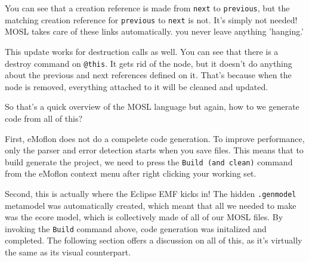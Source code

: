 You can see that a creation reference is made from \texttt{next} to \texttt{previous}, but the matching creation reference for \texttt{previous} to \texttt{next} is not. It's simply not needed! MOSL takes care of these links automatically. you never leave anything 'hanging.'

This update works for destruction calls as well. You can see that there is a destroy command on \texttt{@this}. It gets rid of the node, but it doesn't do anything about the previous and next references defined on it. That's because when the node is removed, everything attached to it will be cleaned and updated.
 
So that's a quick overview of the MOSL language but again, how to we generate code from all of this?

First, eMoflon does not do a compelete code generation. To improve performance, only the parser and error detection starts when you save files. This means that to build generate the project, we need to press the \texttt{Build (and clean)} command from the eMoflon context menu after right clicking your working set.


Second, this is actually where the Eclipse EMF kicks in! The hidden \texttt{.genmodel} metamodel was automatically created, which meant that all we needed to make was the ecore model, which is collectively made of all of our MOSL files. By invoking the \texttt{Build} command above, code generation was initalized and completed. The following section offers a discussion on all of this, as it's virtually the same as its visual counterpart.